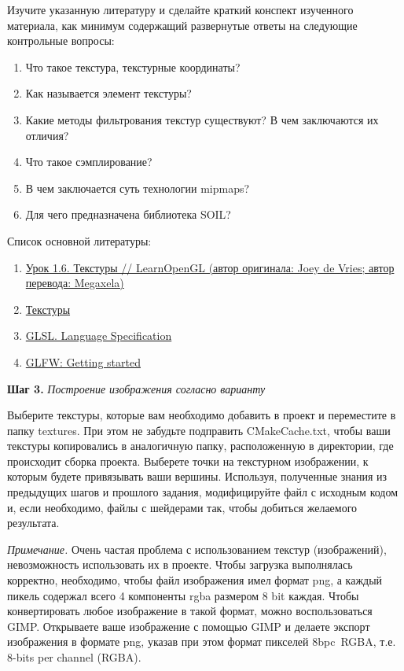 \documentclass[a4paper,12pt]{article}
\begin{document}
    Изучите указанную литературу и сделайте краткий конспект изученного материала, как минимум содержащий развернутые ответы на следующие контрольные вопросы:

    \begin{enumerate}
        \item 
        Что такое текстура, текстурные координаты?
        \item 
        Как называется элемент текстуры?
        \item 
        Какие методы фильтрования текстур существуют? В чем заключаются их отличия?
        \item 
        Что такое сэмплирование?
        \item 
        В чем заключается суть технологии mipmaps?
        \item 
        Для чего предназначена библиотека SOIL?
    \end{enumerate}

    Список основной литературы:
    \begin{enumerate}
        \item \href{https://habr.com/ru/post/315294/}{Урок 1.6. Текстуры // LearnOpenGL (автор оригинала: Joey de Vries; автор перевода: Megaxela)}
        \item \href{Ravesli.com https://ravesli.com/urok-6-tekstury-v-opengl/}{Текстуры}
        \item \href{https://www.khronos.org/registry/OpenGL/specs/gl/}{GLSL. Language Specification}
        \item \href{https://www.glfw.org/docs/latest/quick.html}{GLFW: Getting started}
    \end{enumerate}
    
    \textbf{Шаг 3.} \textit{Построение изображения согласно варианту}
    
    Выберите текстуры, которые вам необходимо добавить в проект и переместите в папку \textquotedbl textures\textquotedbl. При этом не забудьте подправить \textquotedbl CMakeCache.txt\textquotedbl, чтобы ваши текстуры копировались в аналогичную папку, расположенную в директории, где происходит сборка проекта. Выберете точки на текстурном изображении, к которым будете привязывать ваши вершины. Используя, полученные знания из предыдущих шагов и прошлого задания, модифицируйте файл с исходным кодом и, если необходимо, файлы с шейдерами так, чтобы добиться желаемого результата.

    \textit{Примечание.} Очень частая проблема с использованием текстур (изображений), невозможность использовать их в проекте. Чтобы загрузка выполнялась корректно, необходимо, чтобы файл изображения имел формат png, а каждый пикель содержал всего 4 компоненты rgba размером 8 bit каждая. Чтобы конвертировать любое изображение в такой формат, можно воспользоваться GIMP. Открываете ваше изображение с помощью GIMP и делаете экспорт изображения в формате png, указав при этом формат пикселей \textquotedbl 8bpc~RGBA\textquotedbl, т.е. 8-bits per channel (RGBA).
    
\end{document}

